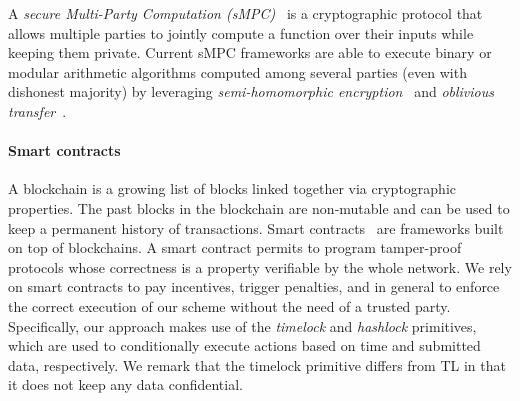 A {\em secure Multi-Party Computation (\em sMPC)}~\cite{DBLP:journals/corr/abs-1804-03548,yao82} is a cryptographic protocol that allows multiple parties to jointly compute a function over their inputs while keeping them private.
Current sMPC frameworks are able to execute binary or modular arithmetic algorithms computed among several parties (even with dishonest majority) by leveraging {\em semi-homomorphic encryption}~\cite{spdz,keller2018overdrive} and {\em oblivious transfer}~\cite{mascot,rabin2005exchange}.

\paragraph*{Smart contracts}

A blockchain is a growing list of blocks linked together via cryptographic properties. The past blocks in the blockchain are non-mutable and can be used to keep a permanent history of transactions.
Smart contracts~\cite{szabo1997formalizing} are frameworks built on top of blockchains.
A smart contract permits to program tamper-proof protocols whose correctness is a property verifiable by the whole network.
%
%
We rely on smart contracts to pay incentives, trigger penalties, and in general to enforce the correct execution of our scheme without the need of a trusted party.
Specifically, our approach makes use of the {\em timelock} and {\em hashlock} primitives, which are used to conditionally execute actions based on time and submitted data, respectively.
We remark that the timelock primitive differs from TL in that it does not keep any data confidential.

